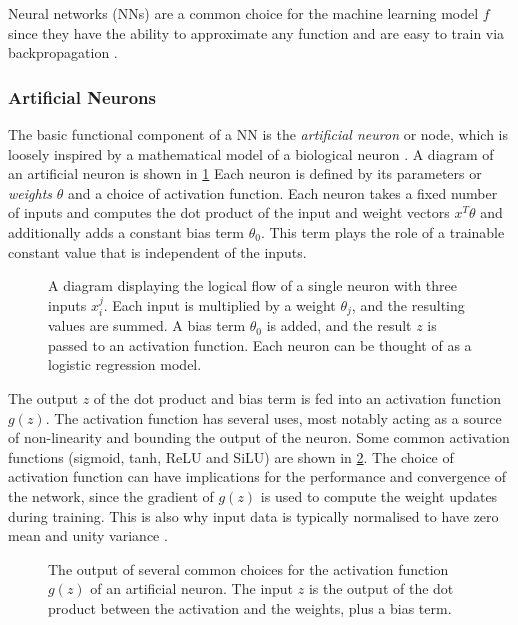 Neural networks (NNs) are a common choice for the machine learning model $f$ since they have the ability to approximate any function \cite{HORNIK1989359} and are easy to train via backpropagation \cite{rumelhart1986learning}.

\subsubsection{Artificial Neurons}

The basic functional component of a NN is the \textit{artificial neuron} or node, which is loosely inspired by a mathematical model of a biological neuron \cite{mcculloch1943logical, hopfield1987neural}.
A diagram of an artificial neuron is shown in \cref{fig:neuron}
Each neuron is defined by its parameters or \textit{weights} $\theta$ and a choice of activation function.
Each neuron takes a fixed number of inputs and computes the dot product of the input and weight vectors $x^T \theta$ and additionally adds a constant bias term $\theta_0$.
This term plays the role of a trainable constant value that is independent of the inputs.

\begin{figure}[!htbp]
    \centering
    
    \caption{
      A diagram displaying the logical flow of a single neuron with three inputs $x_i^j$.
      Each input is multiplied by a weight $\theta_j$, and the resulting values are summed.
      A bias term $\theta_0$ is added, and the result $z$ is passed to an activation function.
      Each neuron can be thought of as a logistic regression model.
    }
    \label{fig:neuron}
\end{figure}

The output $z$ of the dot product and bias term is fed into an activation function $g(z)$.
The activation function has several uses, most notably acting as a source of non-linearity and bounding the output of the neuron.
Some common activation functions (sigmoid, tanh, ReLU and SiLU) \cite{2018arXiv180308375A,2017arXiv170203118E} are shown in \cref{fig:activation_functions}.
The choice of activation function can have implications for the performance and convergence of the network, since the gradient of $g(z)$ is used to compute the weight updates during training.
This is also why input data is typically normalised to have zero mean and unity variance \cite{lecun2012efficient}.

\begin{figure}[!htbp]
  \centering
  
  \caption{
    The output of several common choices for the activation function $g(z)$ of an artificial neuron.
    The input $z$ is the output of the dot product between the activation and the weights, plus a bias term.
  }
  \label{fig:activation_functions}
\end{figure}



